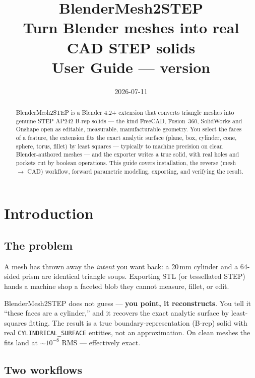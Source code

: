 \documentclass[11pt,a4paper]{article}
\title{\Huge BlenderMesh2STEP\\[0.4em]
  \Large Turn Blender meshes into real CAD STEP solids\\[0.8em]
  \large User Guide --- version \version}
\author{}
\date{2026-07-11}
\begin{document}
\maketitle
\thispagestyle{empty}

\begin{abstract}
\noindent
BlenderMesh2STEP is a Blender 4.2+ extension that converts triangle meshes into
genuine STEP AP242 B-rep solids --- the kind FreeCAD, Fusion~360, SolidWorks
and Onshape open as editable, measurable, manufacturable geometry. You select
the faces of a feature, the extension fits the exact analytic surface (plane,
box, cylinder, cone, sphere, torus, fillet) by least squares --- typically to
machine precision on clean Blender-authored meshes --- and the exporter writes a
true solid, with real holes and pockets cut by boolean operations. This guide
covers installation, the reverse (mesh $\to$ CAD) workflow, forward parametric
modeling, exporting, and verifying the result.
\end{abstract}

\tableofcontents
\clearpage

\section{Introduction}

\subsection{The problem}

A mesh has thrown away the \emph{intent} you want back: a
20\,mm cylinder and a 64-sided prism are identical triangle soups. Exporting
STL (or tessellated STEP) hands a machine shop a faceted blob they cannot
measure, fillet, or edit.

BlenderMesh2STEP does not guess --- \textbf{you point, it reconstructs}. You
tell it ``these faces are a cylinder,'' and it recovers the exact analytic
surface by least-squares fitting. The result is a true boundary-representation
(B-rep) solid with real \texttt{CYLINDRICAL\_SURFACE} entities, not an
approximation. On clean meshes the fits land at $\sim$$10^{-8}$ RMS ---
effectively exact.

\subsection{Two workflows}
\end{document}

